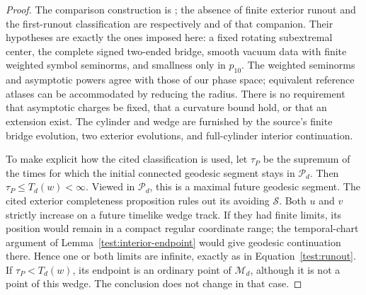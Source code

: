 \begin{proof}
The comparison construction is
\cite[]{Foundation}; the absence of finite
exterior runout and the first-runout classification are respectively
 and  of that companion. Their hypotheses are
exactly the ones imposed here: a fixed rotating subextremal center,
the complete signed two-ended bridge, smooth vacuum data with finite
weighted symbol seminorms, and smallness only in $p_{10}$. The
weighted seminorms and asymptotic powers agree with those of our phase
space; equivalent reference atlases can be accommodated by reducing
the radius. There is no requirement that asymptotic charges be fixed,
that a curvature bound hold, or that an extension exist. The cylinder
and wedge are furnished by the source's finite bridge evolution,
two exterior evolutions, and full-cylinder interior continuation.

To make explicit how the cited classification is used, let
$\tau_P$ be the supremum of the times for which the initial connected
geodesic segment stays in $\mathcal P_d$. Then
$\tau_P\le T_d(w)<\infty$. Viewed in $\mathcal P_d$, this is
a maximal future geodesic segment. The cited exterior completeness
proposition rules out its avoiding $\mathcal S$. Both $u$ and $v$
strictly increase on a future timelike wedge track. If they had finite
limits, its position would remain in a compact regular coordinate
range; the temporal-chart argument of
Lemma~\ref{test:interior-endpoint} would give geodesic continuation
there. Hence one or both limits are infinite, exactly as in
Equation~\eqref{test:runout}. If $\tau_P<T_d(w)$, its endpoint
is an ordinary point of $\mathcal M_d$, although it is not a point
of this wedge. The conclusion does not change in that case.
\end{proof}

